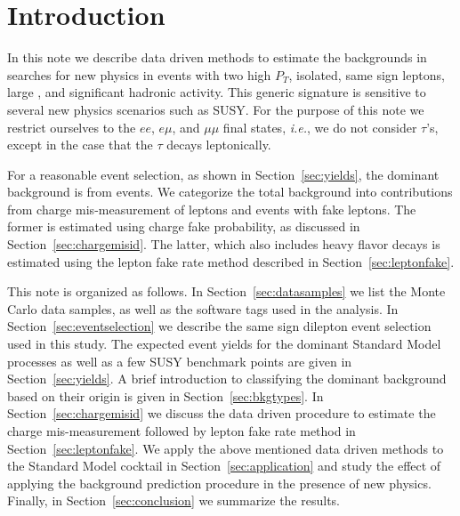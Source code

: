 \section{Introduction}
\label{sec:intro}
In this note we describe data driven methods to estimate the backgrounds in 
searches for new physics in events with two high $P_T$, isolated, same sign leptons,
large \met, and  significant hadronic activity.  This generic signature is sensitive to several
new physics scenarios such as SUSY.  For the purpose of this note we restrict
ourselves to the $ee$, $e\mu$, and $\mu\mu$ final states, {\em i.e.}, we 
do not consider $\tau$'s, except in the case that the $\tau$ decays leptonically.

For a reasonable event selection, as shown in Section~\ref{sec:yields}, the dominant
background is from \ttbar events. We categorize the total background into contributions
from charge mis-measurement of leptons and events with fake leptons. The former is estimated 
using charge fake probability, as discussed in Section~\ref{sec:chargemisid}. The latter, which
also includes  heavy flavor decays is estimated using the lepton fake rate 
method described in Section~\ref{sec:leptonfake}.

This note is organized as follows. In Section~\ref{sec:datasamples} we list the 
Monte Carlo data samples, as well as the software tags used 
in the analysis. In Section~\ref{sec:eventselection} we describe the same sign dilepton event 
selection used in this study.  The expected event yields for the dominant 
Standard Model processes as well as a few SUSY benchmark points are given in Section~\ref{sec:yields}.
A brief introduction to classifying the dominant background based on their origin
is given in Section~\ref{sec:bkgtypes}. In Section~\ref{sec:chargemisid} we discuss the data driven 
procedure to estimate the charge mis-measurement followed by lepton fake rate method in 
Section~\ref{sec:leptonfake}. We apply the above mentioned data driven methods to the Standard Model 
cocktail in Section~\ref{sec:application} and study the effect of applying the background
prediction procedure in the presence of new physics. Finally, in Section~\ref{sec:conclusion}
we summarize the results.  

